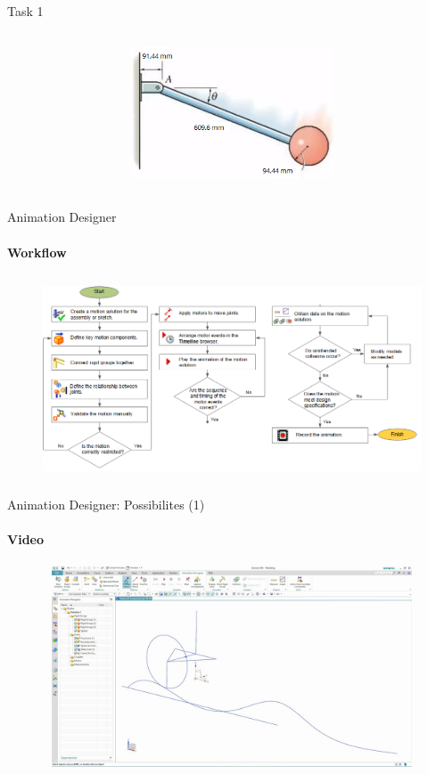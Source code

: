 \documentclass[aspectratio=169]{beamer}
\begin{document}
\begin{frame}[t]{Task 1}
\begin{columns}[T,onlytextwidth]
\begin{column}{0.49\textwidth}
            \begin{figure}[H]
                \centering\includegraphics[height=4cm,width=1\textwidth,keepaspectratio]{task_1.png}
                \label{fig:task_1.png}
            \end{figure}
        \end{column}
    \end{columns}
\end{frame}

\begin{frame}[t]{Animation Designer}
\framesubtitle{Workflow}
    \vspace{-0.6cm}
    \begin{figure}[H]
        \centering\includegraphics[height=6cm,width=1\textwidth,keepaspectratio]{motion_designer_workflow3.png}
        \label{fig:motion_designer_workflow3.png}
    \end{figure}
\end{frame}

\begin{frame}[t]{Animation Designer: Possibilites (1)}
    \framesubtitle{Video}
    \vspace{-0.6cm}
    \begin{figure}[H]
        \href{https://youtu.be/UKjR2YiDg2I}{
            \centering\includegraphics[height=6cm,width=1\textwidth,keepaspectratio]{anim_video1_preview.jpg}}
        \label{fig:anim_video1_preview.jpg}
    \end{figure}
\end{frame}
\end{document}
